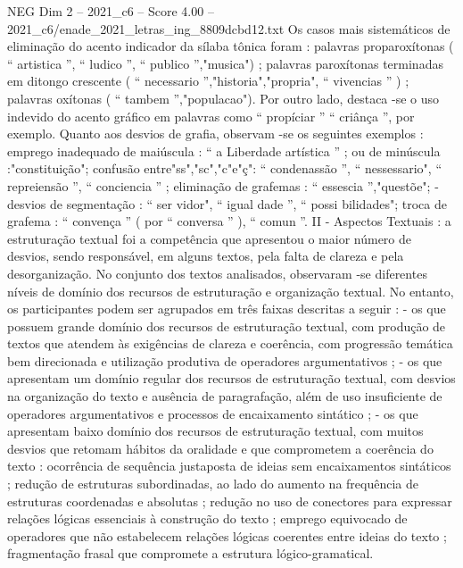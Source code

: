 \begin{textsample}{NEG Dim 2 – 2021\_c6 – Score 4.00 – 2021\_c6/enade\_2021\_letras\_ing\_8809dcbd12.txt}
Os casos mais sistemáticos de eliminação do acento indicador da sílaba tônica foram : palavras proparoxítonas ( “ artistica ”, “ ludico ”, “ publico ”,"musica") ; palavras paroxítonas terminadas em ditongo crescente ( “ necessario ”,"historia","propria", “ vivencias ” ) ; palavras oxítonas ( “ tambem ”,"populacao").
Por outro lado, destaca -se o uso indevido do acento gráfico em palavras como “ propíciar ” “ criânça ”, por exemplo.
Quanto aos desvios de grafia, observam -se os seguintes exemplos : emprego inadequado de maiúscula : “ a Liberdade artística ” ; ou de minúscula :"constituição"; confusão entre"ss","sc","c"e"ç": “ condenassão ”, “ nessessario", “ repreiensão ”, “ conciencia ” ; eliminação de grafemas : “ essescia ”,"questõe"; - desvios de segmentação : “ ser vidor", “ igual dade ”, “ possi bilidades"; troca de grafema : “ convença ” ( por “ conversa ” ), “ comun ”.
II - Aspectos Textuais : a estruturação textual foi a competência que apresentou o maior número de desvios, sendo responsável, em alguns textos, pela falta de clareza e pela desorganização.
No conjunto dos textos analisados, observaram -se diferentes níveis de domínio dos recursos de estruturação e organização textual.
No entanto, os participantes podem ser agrupados em três faixas descritas a seguir : - os que possuem grande domínio dos recursos de estruturação textual, com produção de textos que atendem às exigências de clareza e coerência, com progressão temática bem direcionada e utilização produtiva de operadores argumentativos ; - os que apresentam um domínio regular dos recursos de estruturação textual, com desvios na organização do texto e ausência de paragrafação, além de uso insuficiente de operadores argumentativos e processos de encaixamento sintático ; - os que apresentam baixo domínio dos recursos de estruturação textual, com muitos desvios que retomam hábitos da oralidade e que comprometem a coerência do texto : ocorrência de sequência justaposta de ideias sem encaixamentos sintáticos ; redução de estruturas subordinadas, ao lado do aumento na frequência de estruturas coordenadas e absolutas ; redução no uso de conectores para expressar relações lógicas essenciais à construção do texto ; emprego equivocado de operadores que não estabelecem relações lógicas coerentes entre ideias do texto ; fragmentação frasal que compromete a estrutura lógico-gramatical.

\end{textsample}
